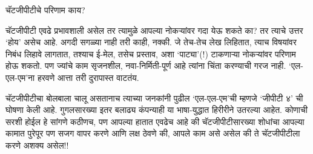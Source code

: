 चॅटजीपीटीचे परिणाम काय?

चॅटजीपीटी एवढे प्रभावशाली असेल तर त्यामुळे आपल्या नोकऱ्यांवर गदा येऊ शकते का? तर त्याचे उत्तर `होय' असेच आहे. अगदी सगळ्या नाही तरी काही, नक्की. जे तेच-तेच लेख लिहितात, त्याच विषयांवर निबंध लिहावे लागतात, तश्याच ई-मेल, तसेच प्रस्ताव, अशा `पाट्या'(!)  टाकणाऱ्या नोकऱ्यांवर परिणाम होऊ शकतो. पण ज्यांचे काम सृजनशील, नवा-निर्मिती-पूर्ण आहे त्यांना चिंता करण्याची गरज नाही. `एल-एल-एम'ना हरवणे आत्ता तरी दुरापास्त वाटतंय.

चॅटजीपीटीचा बोलबाला चालू असतानाच त्याच्या जनकांनी पुढील `एल-एल-एम'ची म्हणजे `जीपीटी ४' ची घोषणा केली आहे. गुगलसारख्या इतर बलाढ्य कंपन्याही या भाषा-युद्धात हिरीरीने उतरल्या आहेत. कोणाची सरशी होईल हे सांगणे कठीणच, पण आपल्या हातात एवढेच आहे की चॅटजीपीटीसारख्या शोधांचा आपल्या कामात पुरेपूर पण सजग वापर करणे आणि लक्ष ठेवणे की, आपले काम असे असेल की ते चॅटजीपीटीला करणे अशक्य असेल!!